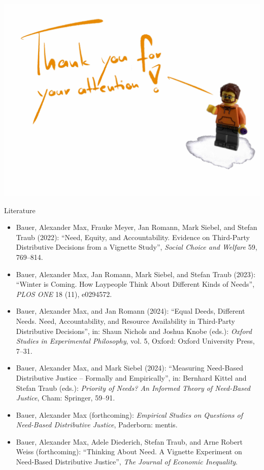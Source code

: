 \documentclass[xcolor=table,9pt,aspectratio=169]{beamer}
\begin{document}
\begin{frame}{}
\begin{center}
   \includegraphics[width=0.8\linewidth]{figures/slides_thanks_english.pdf}
\end{center}
\end{frame}


\begin{frame}{\vspace*{10mm}Literature}
\vspace*{-5mm}
{\footnotesize
\begin{itemize}[label=,leftmargin=2em,itemindent=-2em]
   \item Bauer, Alexander Max, Frauke Meyer, Jan Romann, Mark Siebel, and Stefan Traub (2022): \enquote{Need, Equity, and Accountability. Evidence on Third-Party Distributive Decisions from a Vignette Study}, \textit{Social Choice and Welfare} 59, 769--814.
   \item Bauer, Alexander Max, Jan Romann, Mark Siebel, and Stefan Traub (2023): \enquote{Winter is Coming. How Laypeople Think About Different Kinds of Needs}, \textit{PLOS ONE} 18 (11), e0294572.
   \item Bauer, Alexander Max, and Jan Romann (2024): \enquote{Equal Deeds, Different Needs. Need, Accountability, and Resource Availability in Third-Party Distributive Decisions}, in: Shaun Nichols and Joshua Knobe (eds.): \textit{Oxford Studies in Experimental Philosophy}, vol. 5, Oxford: Oxford University Press, 7--31.
   \item Bauer, Alexander Max, and Mark Siebel (2024): \enquote{Measuring Need-Based Distributive Justice -- Formally and Empirically}, in: Bernhard Kittel and Stefan Traub (eds.): \textit{Priority of Needs? An Informed Theory of Need-Based Justice}, Cham: Springer, 59--91.
   \item Bauer, Alexander Max (forthcoming): \textit{Empirical Studies on Questions of Need-Based Distributive Justice}, Paderborn: mentis.
   \item Bauer, Alexander Max, Adele Diederich, Stefan Traub, and Arne Robert Weiss (forthcoming): \enquote{Thinking About Need. A Vignette Experiment on Need-Based Distributive Justice}, \textit{The Journal of Economic Inequality}.
\end{itemize}
}
\end{frame}
\end{document}
